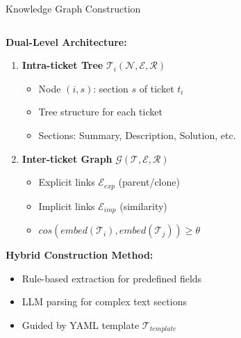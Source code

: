 \documentclass[10pt, aspectratio=169]{beamer}
\begin{document}
\begin{frame}{Knowledge Graph Construction}
    \begin{columns}[T]
        \begin{column}{0.5\textwidth}
            \textbf{Dual-Level Architecture:}
            \begin{enumerate}
                \footnotesize
                \item \textbf{Intra-ticket Tree} $\mathcal{T}_i(\mathcal{N}, \mathcal{E}, \mathcal{R})$
                \begin{itemize}
                    \scriptsize
                    \item Node $(i,s)$: section $s$ of ticket $t_i$
                    \item Tree structure for each ticket
                    \item Sections: Summary, Description, Solution, etc.
                \end{itemize}
                \item \textbf{Inter-ticket Graph} $\mathcal{G}(\mathcal{T}, \mathcal{E}, \mathcal{R})$
                \begin{itemize}
                    \scriptsize
                    \item Explicit links $\mathcal{E}_{exp}$ (parent/clone)
                    \item Implicit links $\mathcal{E}_{imp}$ (similarity)
                    \item $cos(embed(\mathcal{T}_i), embed(\mathcal{T}_j)) \geq \theta$
                \end{itemize}
            \end{enumerate}
            
            \vspace{0.3cm}
            \textbf{Hybrid Construction Method:}
            \begin{itemize}
                \footnotesize
                \item Rule-based extraction for predefined fields
                \item LLM parsing for complex text sections
                \item Guided by YAML template $\mathcal{T}_{template}$
            \end{itemize}
        \end{column}
        
        \begin{column}{0.5\textwidth}
            \begin{center}
\end{center}
\end{column}
\end{columns}
\end{frame}
\end{document}
